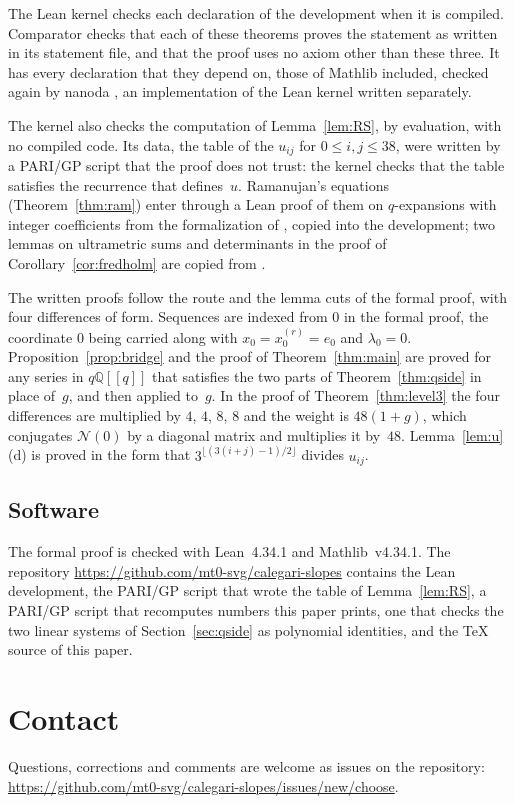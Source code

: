 \documentclass[11pt]{amsart}
\newcommand{\repo}{https://github.com/mt0-svg/calegari-slopes}
\theoremstyle{definition}
\numberwithin{equation}{section}
\newcommand{\Q}{\mathbb{Q}}
\begin{document}
The Lean kernel checks each declaration of the development when it is compiled. Comparator \cite{Comparator} checks that each of these theorems proves the statement as written in its statement file, and that the proof uses no axiom other than these three. It has every declaration that they depend on, those of Mathlib included, checked again by nanoda \cite{nanoda}, an implementation of the Lean kernel written separately.

The kernel also checks the computation of Lemma~\ref{lem:RS}, by evaluation, with no compiled code. Its data, the table of the $u_{ij}$ for $0\le i,j\le38$, were written by a PARI/GP \cite{PARI} script that the proof does not trust: the kernel checks that the table satisfies the recurrence that defines~$u$. Ramanujan's equations (Theorem~\ref{thm:ram}) enter through a Lean proof of them on $q$-expansions with integer coefficients from the formalization of \cite{FLT}, copied into the development; two lemmas on ultrametric sums and determinants in the proof of Corollary~\ref{cor:fredholm} are copied from \cite{Coram}.

The written proofs follow the route and the lemma cuts of the formal proof, with four differences of form. Sequences are indexed from $0$ in the formal proof, the coordinate $0$ being carried along with $x_0=x^{(r)}_0=e_0$ and $\lambda_0=0$. Proposition~\ref{prop:bridge} and the proof of Theorem~\ref{thm:main} are proved for any series in $q\Q[[q]]$ that satisfies the two parts of Theorem~\ref{thm:qside} in place of~$g$, and then applied to~$g$. In the proof of Theorem~\ref{thm:level3} the four differences are multiplied by $4$, $4$, $8$, $8$ and the weight is $48(1+g)$, which conjugates $\mathcal N(0)$ by a diagonal matrix and multiplies it by~$48$. Lemma~\ref{lem:u}(d) is proved in the form that $3^{\lfloor(3(i+j)-1)/2\rfloor}$ divides $u_{ij}$.

\subsection{Software}\label{sec:lean-soft}
The formal proof is checked with Lean~4.34.1 and Mathlib~v4.34.1. The repository \url{\repo} contains the Lean development, the PARI/GP script that wrote the table of Lemma~\ref{lem:RS}, a PARI/GP script that recomputes numbers this paper prints, one that checks the two linear systems of Section~\ref{sec:qside} as polynomial identities, and the \TeX{} source of this paper.


\section*{Contact}
Questions, corrections and comments are welcome as issues on the repository: \url{\repo/issues/new/choose}.
\end{document}
